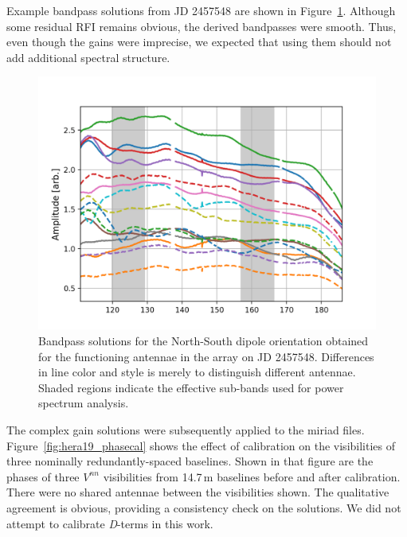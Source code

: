Example bandpass solutions from JD 2457548 are shown in Figure~\ref{fig:hera19_bandpass}. Although some residual RFI remains obvious, the derived bandpasses were smooth.  Thus, even though the gains were imprecise, we expected that using them should not add additional spectral structure.  %

\begin{figure}
\centering
\includegraphics[scale=0.5]{chapters/eor_window_HERA/figures/h19_2457458_abs_smallzoom_nolegend.png}
\caption[Bandpass solutions for the North-South dipole orientation obtained for the functioning antennae in the array on JD 2457548.]{Bandpass solutions for the North-South dipole orientation obtained for the functioning antennae in the array on JD 2457548. Differences in line color and style is merely to distinguish different antennae. Shaded regions indicate the effective sub-bands used for power spectrum analysis.}
\label{fig:hera19_bandpass}
\end{figure}

The complex gain solutions were subsequently applied to the {\sc miriad} files. Figure~\ref{fig:hera19_phasecal} shows the effect of calibration on the visibilities of three nominally redundantly-spaced baselines. Shown in that figure are the phases of three $V^{nn}$ visibilities from 14.7\,m baselines before and after calibration. There were no shared antennae between the visibilities shown. The qualitative agreement is obvious, providing a consistency check on the solutions. We did not attempt to calibrate \textit{D}-terms in this work.

